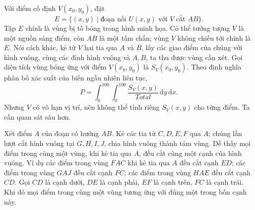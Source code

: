 \documentclass[11pt]{article}
\newcommand{\dd}{\,\mathrm{d}}
\newcommand{\Total}{\mathit{Total}}
\begin{document}
Với điểm cố định \(V(x_0,y_0)\), đặt
\[
  E=\{(x,y)\mid \text{đoạn nối }U(x,y)\text{ với }V\text{ cắt }AB\}.
\]
Tập \(E\) chính là vùng bị tô bóng trong hình minh họa. Có thể tưởng tượng
\(V\) là một nguồn sáng điểm, còn \(AB\) là một tấm chắn; vùng \(V\) không
chiếu tới chính là \(E\). Nói cách khác, kẻ từ \(V\) hai tia qua \(A\) và
\(B\), lấy các giao điểm của chúng với hình vuông, cùng các đỉnh hình vuông và
\(A,B\), ta thu được vùng cần xét. Gọi diện tích vùng bóng ứng với điểm
\(V(x_0,y_0)\) là \(S_V(x_0,y_0)\). Theo định nghĩa phân bố xác suất của biến
ngẫu nhiên liên tục,
\[
  P=\int_0^{100}\int_0^{100}\frac{S_V(x,y)}{\Total}\dd y\dd x.
  \tag{3}
\]
Nhưng \(V\) có vô hạn vị trí, nên không thể tính riêng \(S_V(x,y)\) cho từng
điểm. Ta cần quan sát sâu hơn.

\begin{center}
\end{center}

Xét điểm \(A\) của đoạn có hướng \(AB\). Kẻ các tia từ \(C,D,E,F\) qua \(A\);
chúng lần lượt cắt hình vuông tại \(G,H,I,J\), chia hình vuông thành tám vùng.
Dễ thấy mọi điểm trong cùng một vùng, khi kẻ tia qua \(A\), đều cắt cùng một
cạnh của hình vuông. Ví dụ các điểm trong vùng \(FAC\) khi kẻ tia qua \(A\)
đều cắt cạnh \(ED\); các điểm trong vùng \(GAJ\) đều cắt cạnh \(FC\); các điểm
trong vùng \(HAE\) đều cắt cạnh \(CD\). Gọi \(CD\) là cạnh dưới, \(DE\) là
cạnh phải, \(EF\) là cạnh trên, \(FC\) là cạnh trái. Khi đó mọi điểm trong
cùng một vùng tương ứng với đúng một trong bốn cạnh này.
\end{document}

